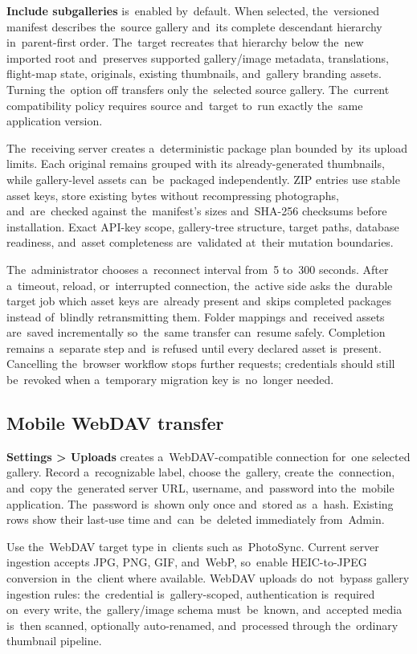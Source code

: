\documentclass[11pt,a4paper]{article}
\newcommand{\ui}[1]{\textbf{#1}}
\begin{document}
\ui{Include subgalleries} is~enabled by~default. When selected, the~versioned
manifest describes the~source gallery and~its complete descendant hierarchy
in~parent-first order. The~target recreates that hierarchy below the~new
imported root and~preserves supported gallery/image metadata, translations,
flight-map state, originals, existing thumbnails, and~gallery branding assets.
Turning the~option off transfers only the~selected source gallery. The~current
compatibility policy requires source and~target to~run exactly the~same
application version.

The~receiving server creates a~deterministic package plan bounded by~its upload
limits. Each original remains grouped with its already-generated thumbnails,
while gallery-level assets can~be~packaged independently. ZIP entries use stable
asset keys, store existing bytes without recompressing photographs,
and~are~checked against the~manifest's sizes and~SHA-256 checksums before
installation. Exact API-key scope, gallery-tree structure, target paths,
database readiness, and~asset completeness are~validated at~their mutation
boundaries.

The~administrator chooses a~reconnect interval from~5 to~300 seconds. After
a~timeout, reload, or~interrupted connection, the~active side asks the~durable
target job which asset keys are~already present and~skips completed packages
instead of~blindly retransmitting them. Folder mappings and~received assets
are~saved incrementally so~the~same transfer can~resume safely. Completion
remains a~separate step and~is refused until every declared asset is~present.
Cancelling the~browser workflow stops further requests; credentials should still
be~revoked when a~temporary migration key is~no~longer needed.

\subsection{Mobile WebDAV transfer}

\ui{Settings > Uploads} creates a~WebDAV-compatible connection for~one selected
gallery. Record a~recognizable label, choose the~gallery, create the~connection,
and~copy the~generated server URL, username, and~password into the~mobile
application. The~password is~shown only once and~stored as~a~hash. Existing rows
show their last-use time and~can~be~deleted immediately from~Admin.

Use the~WebDAV target type in~clients such as~PhotoSync. Current server
ingestion accepts JPG, PNG, GIF, and~WebP, so~enable HEIC-to-JPEG conversion
in~the~client where available. WebDAV uploads do~not~bypass gallery ingestion
rules: the~credential is~gallery-scoped, authentication is~required on~every
write, the~gallery/image schema must~be~known, and~accepted media is~then
scanned, optionally auto-renamed, and~processed through the~ordinary thumbnail
pipeline.
\end{document}
